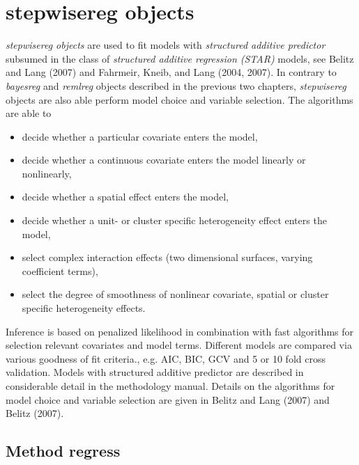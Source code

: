 \chapter{stepwisereg objects}
\normalsize
\label{stepwisereg} 

{\em stepwisereg objects} are used to fit models with {\em structured
additive predictor} subsumed in the class of {\em structured
additive regression (STAR)} models, see Belitz and Lang (2007) and
Fahrmeir, Kneib, and Lang (2004, 2007). In contrary to {\em bayesreg} and
{\em remlreg} objects described in the previous two chapters, {\em stepwisereg}
objects are also able perform model choice and variable selection. The algorithms are able to
\begin{itemize}
\item decide whether a particular covariate enters the model,
\item decide whether a continuous covariate enters the model linearly or nonlinearly,
\item decide whether a spatial effect enters the model,
\item decide whether a unit- or cluster specific heterogeneity effect enters the model,
\item select complex interaction effects (two dimensional surfaces, varying coefficient terms),
\item select the degree of smoothness of  nonlinear covariate, spatial or cluster specific heterogeneity effects.
\end{itemize}
Inference is based on penalized likelihood in combination with fast algorithms for selection relevant covariates
and model terms. Different models are compared via various goodness of fit criteria., e.g. AIC, BIC, GCV and 5 or 10 fold cross
validation. Models with structured additive predictor are described in considerable detail in
the methodology manual. Details on the algorithms for model choice and variable selection are given in Belitz and Lang (2007) and Belitz (2007).

     


\section{Method regress}
  \label{stepwiseregregress}


